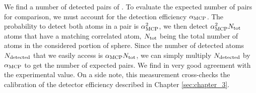 We find a number of detected pairs of . To evaluate the expected number of pairs for comparison, we must account for the detection efficiency $\alpha_{\rm{MCP}}$. The probability to detect both atoms in a pair is $\alpha_{\rm{MCP}}^2$, we then detect $\alpha_{\rm{MCP}}^2 N_{\rm{tot}}$ atoms that have a matching correlated atom, $N_{\rm{tot}}$ being the total number of atoms in the considered portion of sphere. Since the number of detected atoms $N_{\rm{detected}}$ that we easily access is $\alpha_{\rm{MCP}} N_{\rm{tot}}$, we can simply multiply $N_{\rm{detected}}$ by $\alpha_{\rm{MCP}}$ to get the number of expected pairs. We find  in very good agreement with the experimental value. On a side note, this measurement cross-checks the calibration of the detector efficiency described in Chapter \ref{sec:chapter_3}.

    
    
    
    

